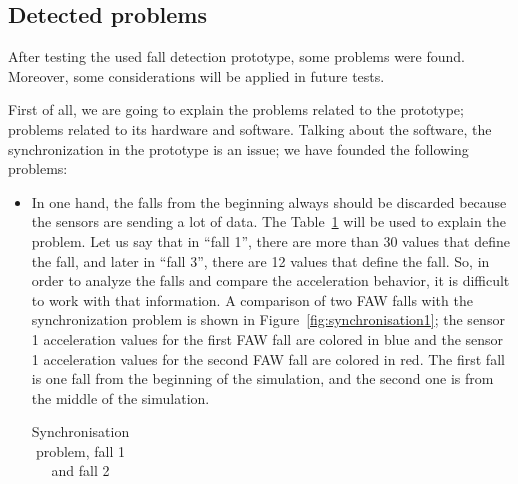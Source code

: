 \documentclass[review]{elsarticle}
\begin{document}
\subsection{Detected problems}
\label{sub:detectedproblems}

After testing the used fall detection prototype, some problems were 
found. Moreover, some considerations will be applied in future tests.

First of all, we are going to explain the problems related to the prototype; problems related to its hardware and
software. Talking about the software, the synchronization in the prototype is an issue; we have founded the following problems:

\begin{itemize}
 \item In one hand, the falls from the beginning always should be discarded because the sensors are 
 sending a lot of data. The Table~\ref{tabla:Synchro} will be used to explain the problem. Let us say 
 that in ``fall 1'', there are more than 30 values that define the fall, and later in ``fall 3'', there are 
 12 values that define the fall. So, in order to analyze the falls and compare the acceleration behavior, it is 
 difficult to work with that information. A comparison of two FAW falls with the synchronization problem is shown
 in Figure~\ref{fig:synchronisation1}; the sensor 1 acceleration values for the first FAW fall are colored in blue and the
 sensor 1 acceleration values for the second FAW fall are colored in red. The first fall is one fall from the beginning
 of the simulation, and the second one is from the middle of the simulation. \newpage
 
 
 \begin{table}[!ht]
 \centering
 \begin{tabular}{*{5}{r}}
   
 \end{tabular}
 \caption{Synchronisation problem, fall 1 and fall 2}%
 \label{tabla:Synchro}
 \end{table} 


\end{itemize}
\end{document}
